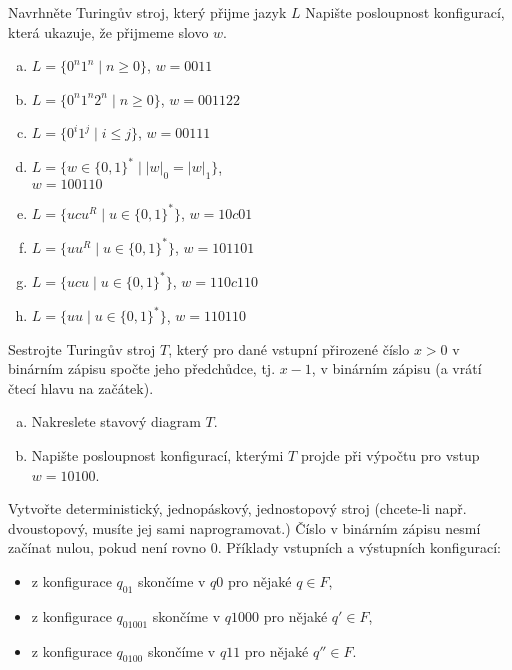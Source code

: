 \documentclass[a4paper,12pt]{amsart}
\begin{document}
\medskip\begin{problem}

    Navrhněte Turingův stroj, který přijme jazyk $L$ Napište posloupnost konfigurací, která ukazuje, že přijmeme slovo $w$. 
    
    \begin{multicols}{2}
    \begin{enumerate}[(a)]
        \item $L=\{0^n1^n\mid n\geq 0\}$, $w=0011$
        \item $L=\{0^n1^n2^n\mid n\geq 0\}$, $w=001122$
        \item $L=\{0^i1^j\mid i\leq j\}$, $w=00111$
        \item $L=\{w\in\{0,1\}^*\mid |w|_0=|w|_1\}$,\\ $w=100110$
        \item $L=\{ucu^R\mid u\in\{0,1\}^*\}$, $w=10c01$
        \item $L=\{uu^R\mid u\in\{0,1\}^*\}$, $w=101101$
        \item $L=\{ucu\mid u \in\{0,1\}^*\}$, $w=110c110$
        \item $L=\{uu\mid u \in\{0,1\}^*\}$, $w=110110$
    \end{enumerate}
    \end{multicols}

\end{problem}


\medskip\begin{problem}[Předchůdce]

    Sestrojte Turingův stroj $T$, který pro dané vstupní přirozené číslo $x>0$ v binárním zápisu spočte jeho předchůdce, tj. $x-1$, v binárním zápisu (a vrátí čtecí hlavu na začátek). %
    
    \smallskip
    \begin{enumerate}[(a)]    
        \item Nakreslete stavový diagram $T$.
        \item Napište posloupnost konfigurací, kterými $T$ projde při výpočtu pro vstup $w=10100$.
    \end{enumerate}

    Vytvořte deterministický, jednopáskový, jednostopový stroj (chcete-li např. dvoustopový, musíte jej sami naprogramovat.) Číslo v binárním zápisu nesmí začínat nulou, pokud není rovno 0. Příklady vstupních a výstupních konfigurací: 
        
    \begin{itemize}    
        \item z konfigurace $q_01$ skončíme v $q0$ pro nějaké $q\in F$,
        \item z konfigurace $q_01001$ skončíme v $q1000$ pro nějaké $q'\in F$,
        \item z konfigurace $q_0100$ skončíme v $q11$ pro nějaké $q''\in F$.
    \end{itemize}
    
\end{problem}
\end{document}

